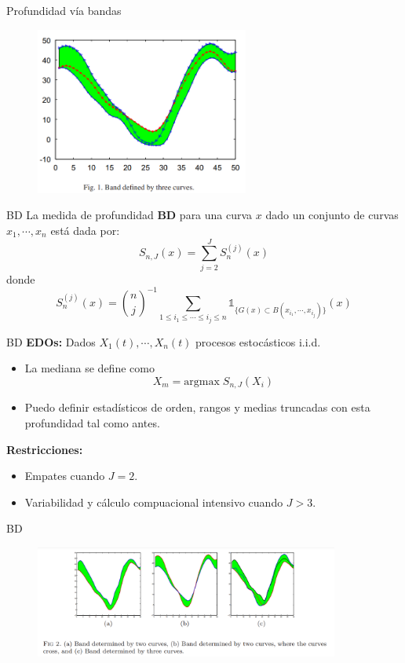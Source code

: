 \documentclass[10pt]{beamer}
\begin{document}
{{\begin{frame}{Profundidad vía bandas}
    \begin{figure}
        \centering
        \includegraphics[width=7cm]{Picture2.png}
    \end{figure}
\end{frame}

\begin{frame}{BD}
    La medida de profundidad \textbf{BD} para una curva $x$ dado un conjunto de curvas $x_1,\cdots,x_n$ está dada por:
    $$S_{n,J}(x)=\sum_{j=2}^J S_n^{(j)}(x)$$
    donde 
    $$S_n^{(j)}(x)=\binom{n}{j}^{-1}\sum_{1\leq i_1\leq\cdots\leq i_j\leq n} \mathds{1}_{\{G(x)\subset B(x_{i_1},\cdots ,x_{i_j})\}}(x)$$
\end{frame}

\begin{frame}{BD}
\textbf{EDOs:}
Dados $X_1(t),\cdots,X_n(t)$ procesos estocásticos i.i.d.\pause
    \begin{itemize}
        \item La mediana se define como 
        $$X_{m}=\mathrm{argmax}\;S_{n,J}(X_i)$$
        \item \pause Puedo definir estadísticos de orden, rangos y medias truncadas con esta profundidad tal como antes.
    \end{itemize} 
\textbf{Restricciones:}\pause
\begin{itemize}
    \item Empates cuando $J=2$. \pause 
    \item Variabilidad y cálculo compuacional intensivo cuando $J>3$.
\end{itemize}
\end{frame}

\begin{frame}{BD}
    \begin{figure}
        \centering
        \includegraphics[width=10cm]{Picture3.png}
    \end{figure}
\end{frame}

}}
\end{document}
